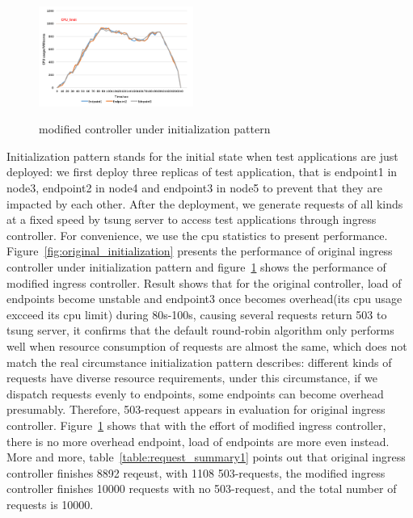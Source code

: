 \begin{figure}[!htb]
 \centering
 \includegraphics[width=0.45\textwidth]{images/data2.png}\\
 \caption{modified controller under initialization pattern}
 \label{fig:modified_initialization}
\end{figure}

Initialization pattern stands for the initial state when test applications are just deployed: we first deploy three replicas of test application, that is endpoint1 in node3, endpoint2 in node4 and endpoint3 in node5 to prevent that they are impacted by each other. After the deployment, we generate requests of all kinds at a fixed speed by tsung server to access test applications through ingress controller. For convenience, we use the cpu statistics to present performance. Figure~\ref{fig:original_initialization} presents the performance of original ingress controller under initialization pattern and figure~{\ref{fig:modified_initialization}} shows the performance of modified ingress controller. Result shows that for the original controller, load of endpoints become unstable and endpoint3 once becomes overhead(its cpu usage excceed its cpu limit) during 80s-100s, causing several requests return 503 to tsung server, it confirms that the default round-robin algorithm only performs well when resource consumption of requests are almost the same, which does not match the real circumstance initialization pattern describes: different kinds of requests have diverse resource requirements, under this circumstance, if we dispatch requests evenly to endpoints, some endpoints can become overhead presumably. Therefore, 503-request appears in evaluation for original ingress controller. Figure~{\ref{fig:modified_initialization}} shows that with the effort of modified ingress controller, there is no more overhead endpoint, load of endpoints are more even instead. More and more, table~{\ref{table:request_summary1}} points out that original ingress controller finishes 8892 reqeust, with 1108 503-requests, the modified ingress controller finishes 10000 requests with no 503-request, and the total number of requests is 10000.
